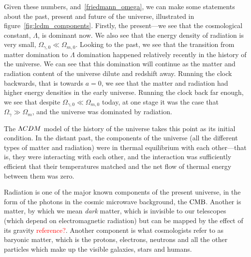     Given these numbers, and~\eqref{friedmann_omega}, we can make some statements
    about the past, present and future of the universe, illustrated in figure~\ref{fig:lcdm_components}.
    Firstly, the present---we see that the cosmological constant,
    $\Lambda$, is dominant now. We also see that the energy density of radiation
    is very small, $\Omega_{\gamma,0}\ll\Omega_{m,0}$.
    Looking to the past, we see that the transition from matter domination
    to $\Lambda$ domination happened relatively recently in the history of the universe.
    We can see that this domination will continue as the matter and radiation content of the
    universe dilute and redshift away.
    Running the clock backwards, that is towards $a=0$, we see that the matter and radiation had
    higher energy densities in the early universe. Running the clock back far enough, we see
    that despite $\Omega_{\gamma,0}\ll\Omega_{m,0}$ today, at one stage it was the
    case that $\Omega_{\gamma}\gg\Omega_{m}$, and the universe was dominated by radiation.


    The $\Lambda CDM$ model of the history of the universe takes this point as its initial condition.
    In the distant past, the components of the universe (all the different types of matter and radiation)
    were in thermal equilibrium with each other---that is, they were interacting with each other,
    and the interaction was sufficiently efficient that their temperatures matched
    and the net flow of thermal energy between them was zero.


    Radiation is one of the major known components of the present universe, in the form of the
    photons in the cosmic microwave background, the $\text{CMB}$. Another is matter, by which we mean \textit{dark} matter,
    which is invisible to our telescopes (which depend on electromagnetic radiation) but can be mapped by the
    effect of its gravity \textcolor{red}{reference?}.
    Another component is what cosmologists refer to as baryonic matter, which is
    the protons, electrons, neutrons and all the other particles which make up the visible galaxies, stars
    and humans.


